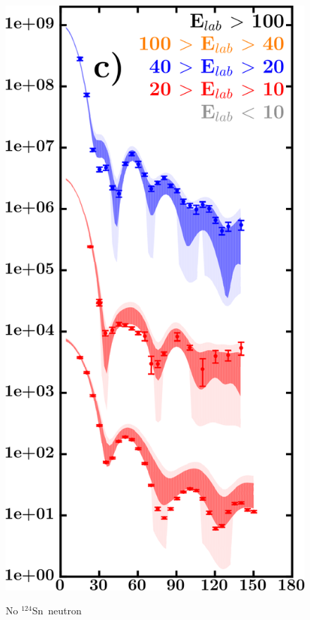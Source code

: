 \documentclass[twocolumn,secnumarabic,amssymb, nobibnotes, aps, prl,
superscriptaddress, nobalancelastpage, draft]{revtex4}
\newcommand{\snFour}{\ensuremath{^{124}}S\lowercase{n}}
\begin{document}
\begin{figure}[!htb]
\begin{minipage}{0.4\linewidth}
\begin{minipage}{0.5\linewidth}
            \includegraphics[width=\linewidth]{figures/sn124_neutronElastic.png}
        \end{minipage}
        \begin{minipage}{0.45\linewidth}
            \centering
            No \snFour\ neutron \\

\end{minipage}
\end{minipage}
\end{figure}
\end{document}

